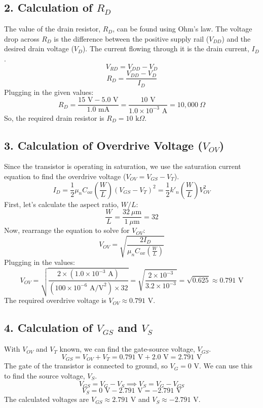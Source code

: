 \documentclass{article}
\begin{document}
\subsection*{2. Calculation of $R_D$}
The value of the drain resistor, $R_D$, can be found using Ohm's law. The voltage drop across $R_D$ is the difference between the positive supply rail ($V_{DD}$) and the desired drain voltage ($V_D$). The current flowing through it is the drain current, $I_D$.
\[ V_{RD} = V_{DD} - V_D \]
\[ R_D = \frac{V_{DD} - V_D}{I_D} \]
Plugging in the given values:
\[ R_D = \frac{15 \text{ V} - 5.0 \text{ V}}{1.0 \text{ mA}} = \frac{10 \text{ V}}{1.0 \times 10^{-3} \text{ A}} = 10,000 \ \Omega \]
So, the required drain resistor is \textbf{$R_D = 10 \text{ k}\Omega$}.

\subsection*{3. Calculation of Overdrive Voltage ($V_{OV}$)}
Since the transistor is operating in saturation, we use the saturation current equation to find the overdrive voltage ($V_{OV} = V_{GS} - V_T$).
\[ I_D = \frac{1}{2} \mu_n C_{ox} \left(\frac{W}{L}\right) (V_{GS} - V_T)^2 = \frac{1}{2} k'_n \left(\frac{W}{L}\right) V_{OV}^2 \]
First, let's calculate the aspect ratio, $W/L$:
\[ \frac{W}{L} = \frac{32 \ \mu\text{m}}{1 \ \mu\text{m}} = 32 \]
Now, rearrange the equation to solve for $V_{OV}$:
\[ V_{OV} = \sqrt{\frac{2 I_D}{\mu_n C_{ox} \left(\frac{W}{L}\right)}} \]
Plugging in the values:
\[ V_{OV} = \sqrt{\frac{2 \times (1.0 \times 10^{-3} \text{ A})}{(100 \times 10^{-6} \text{ A/V}^2) \times 32}} = \sqrt{\frac{2 \times 10^{-3}}{3.2 \times 10^{-3}}} = \sqrt{0.625} \approx 0.791 \text{ V} \]
The required overdrive voltage is \textbf{$V_{OV} \approx 0.791 \text{ V}$}.

\subsection*{4. Calculation of $V_{GS}$ and $V_S$}
With $V_{OV}$ and $V_T$ known, we can find the gate-source voltage, $V_{GS}$.
\[ V_{GS} = V_{OV} + V_T = 0.791 \text{ V} + 2.0 \text{ V} = 2.791 \text{ V} \]
The gate of the transistor is connected to ground, so $V_G = 0 \text{ V}$. We can use this to find the source voltage, $V_S$.
\[ V_{GS} = V_G - V_S \implies V_S = V_G - V_{GS} \]
\[ V_S = 0 \text{ V} - 2.791 \text{ V} = -2.791 \text{ V} \]
The calculated voltages are \textbf{$V_{GS} \approx 2.791 \text{ V}$} and \textbf{$V_S \approx -2.791 \text{ V}$}.
\end{document}
